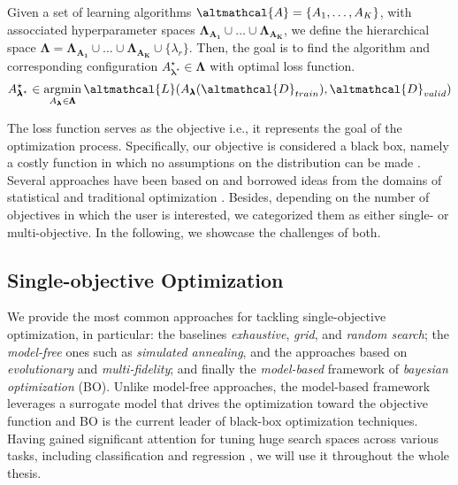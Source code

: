 \begin{definition}
    Given a set of learning algorithms $\altmathcal{A} = \{A_1, \dots, A_K\}$, with assocciated hyperparameter spaces  $\pmb{\Lambda_{A_1}} \cup \dots \cup \pmb{\Lambda_{A_K}}$, we define the hierarchical space $\pmb{\Lambda} = \pmb{\Lambda_{A_1}} \cup \dots \cup \pmb{\Lambda_{A_K}} \cup \{\lambda_r\}$. Then, the goal is to find the algorithm and corresponding configuration $A^{\star}_{\pmb{\lambda}^{\star}} \in \pmb{\Lambda}$ with optimal loss function.
    \begin{equation*}
        A^{\star}_{\pmb{\lambda}^{\star}} \in \argmin_{A_{\pmb{\lambda}} \in \pmb{\Lambda}} \altmathcal{L}(A_{\pmb{\lambda}}(\altmathcal{D}_{train}), \altmathcal{D}_{valid})
    \end{equation*}
\end{definition}

The loss function serves as the objective i.e., it represents the goal of the optimization process.
Specifically, our objective is considered a black box, namely a costly function in which no assumptions on the distribution can be made \cite{69, 134, 88, 55}.
Several approaches have been based on and borrowed ideas from the domains of statistical and traditional optimization \cite{opt_algos}.
Besides, depending on the number of objectives in which the user is interested, we categorized them as either single- or multi-objective.
In the following, we showcase the challenges of both.

\subsection{Single-objective Optimization}

We provide the most common approaches for tackling single-objective optimization, in particular: the baselines \textit{exhaustive}, \textit{grid}, and \textit{random search};  the \textit{model-free} ones such as \textit{simulated annealing}, and the approaches based on \textit{evolutionary} and \textit{multi-fidelity}; and finally the \textit{model-based} framework of \textit{bayesian optimization} (BO).
Unlike model-free approaches, the model-based framework leverages a surrogate model that drives the optimization toward the objective function and BO is the current leader of black-box optimization techniques.
Having gained significant attention for tuning huge search spaces across various tasks, including classification and regression \cite{113, 112}, we will use it throughout the whole thesis.

